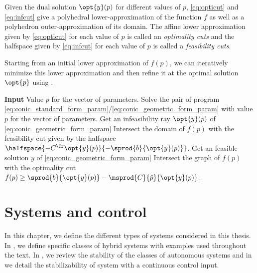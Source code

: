 \documentclass[11pt,twoside,a4paper,openright]{uclouvain-thesis}
\newcommand{\implementations}[1]{}
\begin{document}
Given the dual solution $\opt{y}(p)$ for different values of $p$,
\eqref{eq:opticut} and \eqref{eq:infcut} give
a polyhedral lower-approximation of the function $f$ as well as a polyhedron outer-approximation of its domain.
The affine lower approximation given by \eqref{eq:opticut} for each value of $p$
is called an \emph{optimality cuts}
and the halfspace given by \eqref{eq:infcut} for each value of $p$
is called a \emph{feasibility cuts}.

Starting from an initial lower approximation of $f(p)$,
we can iteratively minimize this lower approximation and then
refine it at the optimal solution $\opt{p}$ using .

\begin{algorithm}[!ht]
  \caption{Cut generation for a parametrized program.}
  \label{algo:cutgen}
  \begin{algorithmic}
    \STATE \textbf{Input} Value $p$ for the vector of parameters.
    \STATE Solve the pair of program \eqref{eq:conic_standard_form_param}/\eqref{eq:conic_geometric_form_param} with value $p$ for the vector of parameters.
    \STATE Get an infeasibility ray $\opt{y}(p)$ of \eqref{eq:conic_geometric_form_param}
    \STATE Intersect the domain of $f(p)$ with the feasibility cut given by the halfspace
    $\halfspace{-C^\Tr \opt{y}(p)}{-\sprod{b}{\opt{y}(p)}}$.
    \ELSE
    \STATE Get an feasible solution $y$ of \eqref{eq:conic_geometric_form_param}
    \STATE Intersect the graph of $f(p)$ with the optimality cut $f(p) \ge \sprod{b}{\opt{y}(p)} - \msprod{C}{\hat{p}}{\opt{y}(p)}$.
    \ENDIF
  \end{algorithmic}
\end{algorithm}







\implementations{\jlpkg{StructDualDynProg}.}

\chapter{Systems and control}
\label{chap:sys}

In this chapter, we define the different types of systems considered in this thesis.
In , we define specific classes of hybrid systems with examples used throughout the text.
In , we review the stability of the classes of autonomous systems and in 
we detail the stabilizability of system with a continuous control input.
\end{document}
